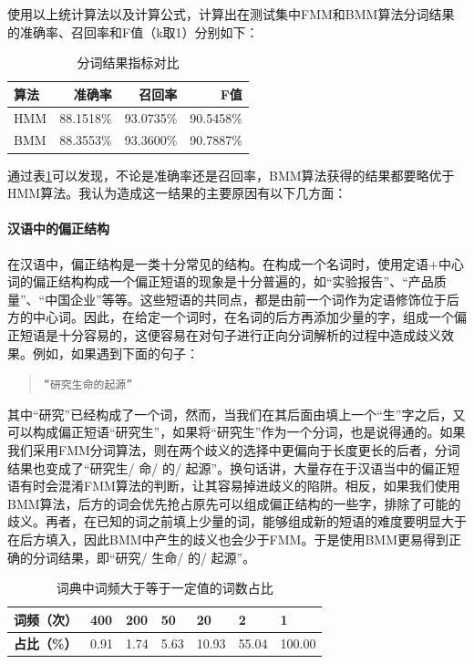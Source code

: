 \documentclass[11pt,a4paper]{article}
\begin{document}
	使用以上统计算法以及计算公式，计算出在测试集中FMM和BMM算法分词结果的准确率、召回率和F值（k取1）分别如下：
	\begin{table}[htb]
		\centering
		\begin{tabular}{lrrr}
			\hline \textbf{算法} & \textbf{准确率} & \textbf{召回率} & \textbf{F值}\\ \hline
			HMM & 88.1518\% & 93.0735\% & 90.5458\%\\
			BMM & 88.3553\% & 93.3600\% & 90.7887\%\\
			\hline
		\end{tabular}
		\caption{\label{p_r_f_table} 分词结果指标对比 }
	\end{table}
	通过表\ref{p_r_f_table}可以发现，不论是准确率还是召回率，BMM算法获得的结果都要略优于HMM算法。我认为造成这一结果的主要原因有以下几方面：
	\paragraph{汉语中的偏正结构}
	在汉语中，偏正结构是一类十分常见的结构。在构成一个名词时，使用定语+中心词的偏正结构构成一个偏正短语的现象是十分普遍的，如“实验报告”、“产品质量”、“中国企业”等等。这些短语的共同点，都是由前一个词作为定语修饰位于后方的中心词。因此，在给定一个词时，在名词的后方再添加少量的字，组成一个偏正短语是十分容易的，这便容易在对句子进行正向分词解析的过程中造成歧义效果。例如，如果遇到下面的句子：
	\begin{quote}
		\verb|“研究生命的起源”|\\
	\end{quote}
	其中“研究”已经构成了一个词，然而，当我们在其后面由填上一个“生”字之后，又可以构成偏正短语“研究生”，如果将“研究生”作为一个分词，也是说得通的。如果我们采用FMM分词算法，则在两个歧义的选择中更偏向于长度更长的后者，分词结果也变成了“研究生/ 命/ 的/ 起源”。换句话讲，大量存在于汉语当中的偏正短语有时会混淆FMM算法的判断，让其容易掉进歧义的陷阱。相反，如果我们使用BMM算法，后方的词会优先抢占原先可以组成偏正结构的一些字，排除了可能的歧义。再者，在已知的词之前填上少量的词，能够组成新的短语的难度要明显大于在后方填入，因此BMM中产生的歧义也会少于FMM。于是使用BMM更易得到正确的分词结果，即“研究/ 生命/ 的/ 起源”。
	\begin{table}[h]
		\centering
		\begin{tabular}{l|llllll}
			\hline
			\textbf{词频（次）}  & 400  & 200  & 50   & 20    & 2     & 1      \\ \hline
			\textbf{占比（\%）} & 0.91 & 1.74 & 5.63 & 10.93 & 55.04 & 100.00 \\ \hline
		\end{tabular}
		\caption{词典中词频大于等于一定值的词数占比}
		\label{sxy:t1}
	\end{table}
\end{document}
